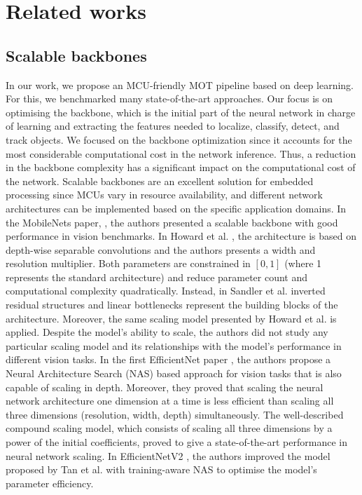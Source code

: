 \section{Related works}

\subsection{Scalable backbones}
In our work, we propose an MCU-friendly MOT pipeline based on deep learning. For this, we benchmarked many state-of-the-art approaches.
Our focus is on optimising the backbone, which is the initial part of the neural network in charge of learning and extracting the features needed to localize, classify, detect, and track objects. %
We focused on the backbone optimization since it accounts for the most considerable computational cost in the network inference. Thus, a reduction in the backbone complexity has a significant impact on the computational cost of the network.
Scalable backbones are an excellent solution for embedded processing since MCUs vary in resource availability, and different network architectures can be implemented based on the specific application domains.
 In the MobileNets paper, \cite{howard2017mobilenets, sandler2018mobilenetv2}, the authors presented a scalable backbone with good performance in vision benchmarks. In Howard et al. \cite{howard2017mobilenets}, the architecture is based on depth-wise separable convolutions and the authors presents a width and resolution multiplier. Both parameters are constrained in $[0, 1]$ (where 1 represents the standard architecture) and reduce parameter count and computational complexity quadratically. Instead, in Sandler et al. \cite{sandler2018mobilenetv2} inverted residual structures and linear bottlenecks represent the building blocks of the architecture. Moreover, the same scaling model presented by Howard et al. \cite{howard2017mobilenets} is applied.
Despite the model's ability to scale, the authors did not study any particular scaling model and its relationships with the model's performance in different vision tasks.
In the first EfficientNet paper \cite{tan2019efficientnet}, the authors propose a Neural Architecture Search (NAS) based approach for vision tasks that is also capable of scaling in depth. Moreover, they proved that scaling the neural network architecture one dimension at a time is less efficient than scaling all three dimensions (resolution, width, depth) simultaneously. The well-described compound scaling model, which consists of scaling all three dimensions by a power of the initial coefficients, proved to give a state-of-the-art performance in neural network scaling.
In EfficientNetV2 \cite{tan2021efficientnetv2}, the authors improved the model proposed by Tan et al. \cite{tan2019efficientnet} with training-aware NAS to optimise the model's parameter efficiency.

